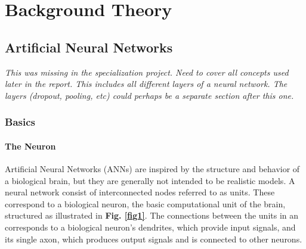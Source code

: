 
\chapter{Background Theory}

\section{Artificial Neural Networks}

\textit{This was missing in the specialization project. Need to cover all concepts used later in the report. This includes all different layers of a neural network. The layers (dropout, pooling, etc) could perhaps be a separate section after this one.}

\subsection{Basics}

\subsubsection{The Neuron}

Artificial Neural Networks (ANNs) are inspired by the structure and behavior of a biological brain, but they are generally not intended to be realistic models. A neural network consist of interconnected nodes referred to as units. These correspond to a biological neuron, the basic computational unit of the brain, structured as illustrated in \textbf{Fig. \ref{fig1}}. The connections between the units in an  corresponds to a biological neuron's dendrites, which provide input signals, and its single axon, which produces output signals and is connected to other neurons. \\

